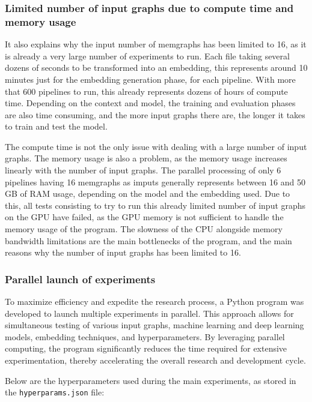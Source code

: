 \subsubsection{Limited number of input graphs due to compute time and memory usage}

It also explains why the input number of memgraphs has been limited to 16, as it is already a very large number of experiments to run. Each file taking several dozens of seconds to be transformed into an embedding, this represents around 10 minutes just for the embedding generation phase, for each pipeline. With more that 600 pipelines to run, this already represents dozens of hours of compute time. Depending on the context and model, the training and evaluation phases are also time consuming, and the more input graphs there are, the longer it takes to train and test the model. 

The compute time is not the only issue with dealing with a large number of input graphs. The memory usage is also a problem, as the memory usage increases linearly with the number of input graphs. The parallel processing of only 6 pipelines having 16 memgraphs as imputs generally represents between 16 and 50 GB of RAM usage, depending on the model and the embedding used. Due to this, all tests consisting to try to run this already limited number of input graphs on the GPU have failed, as the GPU memory is not sufficient to handle the memory usage of the program. The slowness of the CPU alongside memory bandwidth limitations are the main bottlenecks of the program, and the main reasons why the number of input graphs has been limited to 16.

\subsubsection{Parallel launch of experiments}

To maximize efficiency and expedite the research process, a Python program was developed to launch multiple experiments in parallel. This approach allows for simultaneous testing of various input graphs, machine learning and deep learning models, embedding techniques, and hyperparameters. By leveraging parallel computing, the program significantly reduces the time required for extensive experimentation, thereby accelerating the overall research and development cycle.

Below are the hyperparameters used during the main experiments, as stored in the \texttt{hyperparams.json} file:

